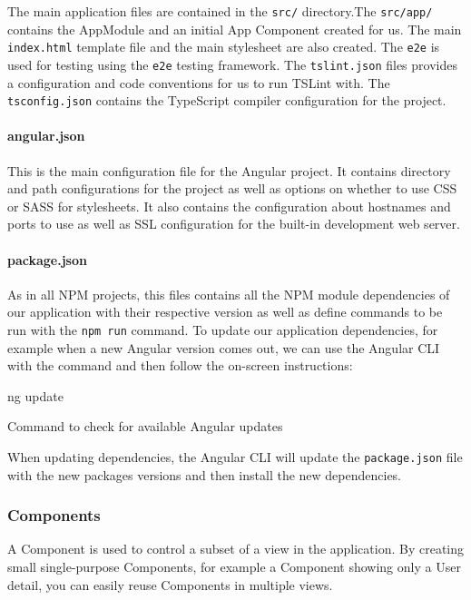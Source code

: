 \documentclass[11pt,a4paper]{report}
\newenvironment{code}{\captionsetup{type=listing}}{}
\begin{document}
The main application files are contained in the \verb+src/+ directory.The \verb+src/app/+ contains the AppModule and an initial App Component created for us. The main \verb+index.html+ template file and the main stylesheet are also created. The \verb+e2e+ is used for testing using the \verb+e2e+ testing framework. The \verb+tslint.json+ files provides a configuration and code conventions for us to run TSLint with. The \verb+tsconfig.json+ contains the TypeScript compiler configuration for the project.
\paragraph{angular.json}
This is the main configuration file for the Angular project. It contains directory and path configurations for the project as well as options on whether to use CSS or SASS for stylesheets. It also contains the configuration about hostnames and ports to use as well as SSL configuration for the built-in development web server.

\paragraph{package.json}
As in all NPM projects, this files contains all the NPM module dependencies of our application with their respective version as well as define commands to be run with the \verb+npm run+ command. To update our application dependencies, for example when a new Angular version comes out, we can use the Angular CLI with the command and then follow the on-screen instructions:
\begin{code}
	\begin{shell}
ng update
	\end{shell}
	\caption{Command to check for available Angular updates}
\end{code}

When updating dependencies, the Angular CLI will update the \verb+package.json+ file with the new packages versions and then install the new dependencies.

\subsubsection{Components}
A Component\cite{angular:doc:components} is used to control a subset of a view in the application. By creating small single-purpose Components, for example a Component showing only a User detail, you can easily reuse Components in multiple views. \\
\end{document}
